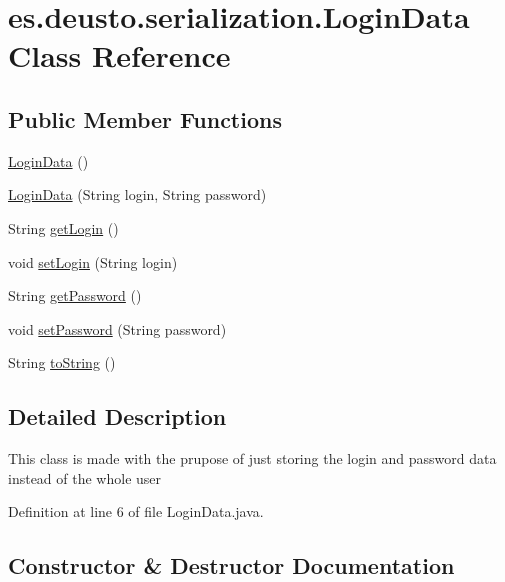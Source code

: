 \hypertarget{classes_1_1deusto_1_1serialization_1_1_login_data}{}\section{es.\+deusto.\+serialization.\+Login\+Data Class Reference}
\label{classes_1_1deusto_1_1serialization_1_1_login_data}
\subsection*{Public Member Functions}
\begin{DoxyCompactItemize}
\item 
\hyperlink{classes_1_1deusto_1_1serialization_1_1_login_data_adc1378ad932252951d270fb5c265b2a0}{Login\+Data} ()
\item 
\hyperlink{classes_1_1deusto_1_1serialization_1_1_login_data_a38ab50660ffb0b1283f825c463b94dd4}{Login\+Data} (String login, String password)
\item 
String \hyperlink{classes_1_1deusto_1_1serialization_1_1_login_data_a0e32fb64e6a069ddf5471b0ad9469e18}{get\+Login} ()
\item 
void \hyperlink{classes_1_1deusto_1_1serialization_1_1_login_data_affe30ee001271b2264106eeecc302882}{set\+Login} (String login)
\item 
String \hyperlink{classes_1_1deusto_1_1serialization_1_1_login_data_a39504f63e22c01e184427621c9b7cb12}{get\+Password} ()
\item 
void \hyperlink{classes_1_1deusto_1_1serialization_1_1_login_data_a8a744db82f9ddad859e04b6069502409}{set\+Password} (String password)
\item 
String \hyperlink{classes_1_1deusto_1_1serialization_1_1_login_data_a638424167a2321d58645b31fe9aef420}{to\+String} ()
\end{DoxyCompactItemize}


\subsection{Detailed Description}
This class is made with the prupose of just storing the login and password data instead of the whole user 

Definition at line 6 of file Login\+Data.\+java.



\subsection{Constructor \& Destructor Documentation}
\mbox{\label{classes_1_1deusto_1_1serialization_1_1_login_data_adc1378ad932252951d270fb5c265b2a0}} 
